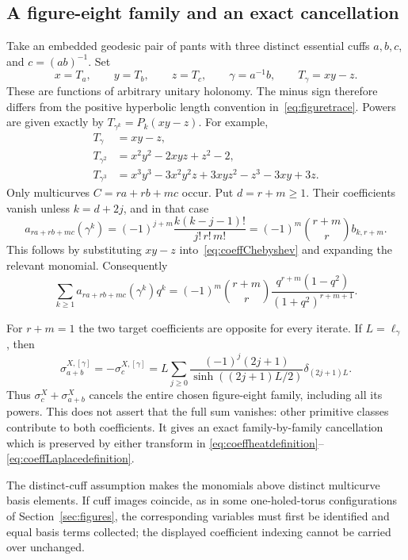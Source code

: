 \documentclass[11pt,a4paper]{article}
\numberwithin{equation}{section}
\theoremstyle{definition}
\theoremstyle{remark}
\begin{document}
\subsection{A figure-eight family and an exact cancellation}

Take an embedded geodesic pair of pants with three distinct essential
cuffs $a,b,c$, and $c=(ab)^{-1}$. Set
\[
 x=T_a,\qquad y=T_b,\qquad z=T_c,\qquad
 \gamma=a^{-1}b,
 \qquad T_\gamma=xy-z.
\]
These are functions of arbitrary unitary holonomy. The minus sign
therefore differs from the positive hyperbolic length convention
in~\eqref{eq:figuretrace}. Powers are given exactly by
$T_{\gamma^k}=P_k(xy-z)$. For example,
\begin{align*}
 T_\gamma&=xy-z,\\
 T_{\gamma^2}&=x^2y^2-2xyz+z^2-2,\\
 T_{\gamma^3}&=x^3y^3-3x^2y^2z+3xyz^2-z^3-3xy+3z.
\end{align*}
Only multicurves $C=ra+rb+mc$ occur. Put $d=r+m\geq1$.
Their coefficients vanish unless $k=d+2j$, and in that case
\begin{equation}
 \boxed{
 a_{ra+rb+mc}(\gamma^k)
 =(-1)^{j+m}\frac{k(k-j-1)!}{j!\,r!\,m!}
 =(-1)^m\binom{r+m}{r}b_{k,r+m}.
 }
 \label{eq:coefffigurepowers}
\end{equation}
This follows by substituting $xy-z$ into~\eqref{eq:coeffChebyshev}
and expanding the relevant monomial. Consequently
\[
 \sum_{k\geq1}a_{ra+rb+mc}(\gamma^k)q^k
 =(-1)^m\binom{r+m}{r}
 \frac{q^{r+m}(1-q^2)}{(1+q^2)^{r+m+1}}.
\]

For $r+m=1$ the two target coefficients are opposite for every
iterate. If $L=\ell_\gamma$, then
\begin{equation}
 \boxed{
 \sigma_{a+b}^{X,[\gamma]}
 =-\sigma_c^{X,[\gamma]}
 =L\sum_{j\geq0}
 \frac{(-1)^j(2j+1)}{\sinh((2j+1)L/2)}
 \delta_{(2j+1)L}.
 }
 \label{eq:coefffigurecancellation}
\end{equation}
Thus $\sigma_c^X+\sigma_{a+b}^X$ cancels the entire chosen
figure-eight family, including all its powers. This does not assert
that the full sum vanishes: other primitive classes contribute to
both coefficients. It gives an exact family-by-family cancellation
which is preserved by either transform in
\eqref{eq:coeffheatdefinition}--\eqref{eq:coeffLaplacedefinition}.

The distinct-cuff assumption makes the monomials above distinct
multicurve basis elements. If cuff images coincide, as in some
one-holed-torus configurations of Section~\ref{sec:figures}, the
corresponding variables must first be identified and equal basis
terms collected; the displayed coefficient indexing cannot be
carried over unchanged.
\end{document}
